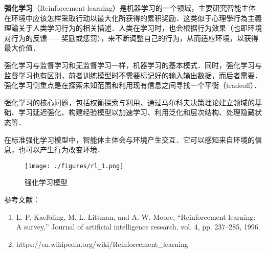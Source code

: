 
\textbf{强化学习}（Reinforcement learning）是机器学习的一个领域，主要研究智能主体在环境中应该怎样采取行动以最大化所获得的累积奖励．这类似于心理學行為主義理論关于人类学习行为的相关描述．人类在学习时，也会根据行为效果（也即环境对行为的反馈——奖励或惩罚），来不断调整自己的行为，从而适应环境，以获得最大价值．

强化学习与监督学习和无监督学习一样，机器学习的基本模式．同时，强化学习与监督学习也有区别，前者训练模型时不需要标记好的输入输出数据，而后者需要．强化学习侧重点是在探索未知范围和利用现有信息之间寻找一个平衡（tradeoff）．

强化学习的核心问题，包括权衡探索与利用、通过马尔科夫决策理论建立领域的基础、学习延迟强化、构建经验模型以加速学习、利用泛化和层次结构、处理隐藏状态等．

在标准强化学习模型中，智能体主体会与环境产生交互．它可以感知来自环境的信息，也可以产生行为改变环境．

\begin{figure}[ht]
\centering
\texttt{[image: ./figures/rl\_1.png]}
\caption{强化学习模型} \label{rl_fig1}
\end{figure}


参考文献：
\begin{enumerate}
\item L. P. Kaelbling, M. L. Littman, and A. W. Moore, “Reinforcement learning: A survey,” Journal of artificial intelligence research, vol. 4, pp. 237–285, 1996.
\item https://en.wikipedia.org/wiki/Reinforcement_learning
\end{enumerate}